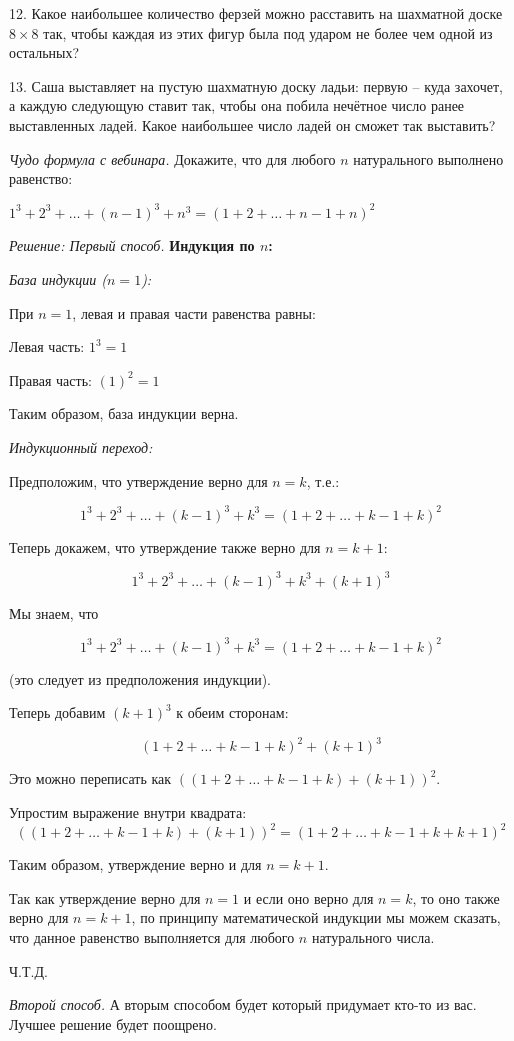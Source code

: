 12. Какое наибольшее количество ферзей можно расставить на шахматной доске $8\times8$ так, чтобы каждая из этих фигур была под ударом не более чем одной из остальных? 

13. Саша выставляет на пустую шахматную доску ладьи: первую – куда захочет, а каждую следующую ставит так, чтобы она побила нечётное число ранее выставленных ладей. Какое наибольшее число ладей он сможет так выставить?


\textit{Чудо формула с вебинара.} Докажите, что для любого $n$ натурального выполнено равенство:

$1^3 + 2^3 + \dotsc + (n-1)^3 + n^3 = (1 + 2 + \dotsc + n-1 + n)^2$

\textit{Решение: Первый способ.} \textbf{Индукция по $n$:}

\textit{База индукции ($n = 1$):}

При $n = 1$, левая и правая части равенства равны:

Левая часть: $1^3 = 1$

Правая часть: $(1)^2 = 1$

Таким образом, база индукции верна.

\textit{Индукционный переход:}

Предположим, что утверждение верно для $n = k$, т.е.:

\[
1^3 + 2^3 + \dots + (k-1)^3 + k^3 = (1 + 2 + \dots + k-1 + k)^2
\]

Теперь докажем, что утверждение также верно для $n = k + 1$:

\[
1^3 + 2^3 + \dots + (k-1)^3 + k^3 + (k + 1)^3
\]

Мы знаем, что

\[
1^3 + 2^3 + \dots + (k-1)^3 + k^3 = (1 + 2 + \dots + k-1 + k)^2
\]

(это следует из предположения индукции).

Теперь добавим $(k + 1)^3$ к обеим сторонам:

\[
(1 + 2 + \dots + k-1 + k)^2 + (k + 1)^3
\]

Это можно переписать как $((1 + 2 + \dots + k-1 + k) + (k + 1))^2$.

Упростим выражение внутри квадрата:
\[
((1 + 2 + \dots + k-1 + k) + (k + 1))^2 = (1 + 2 + \dots + k-1 + k + k + 1)^2
\]

Таким образом, утверждение верно и для $n = k + 1$.

Так как утверждение верно для $n = 1$ и если оно верно для $n = k$, то оно также верно для $n = k + 1$, по принципу математической индукции мы можем сказать, что данное равенство выполняется для любого $n$ натурального числа.
 \begin{flushright}
     Ч.Т.Д.
 \end{flushright}

 \textit{Второй способ.} А вторым способом будет который придумает кто-то из вас. Лучшее решение будет поощрено.

